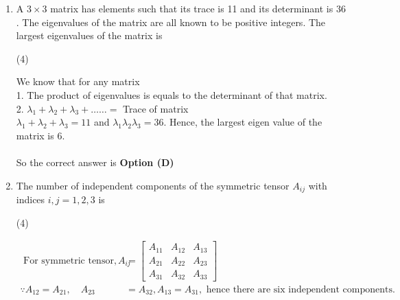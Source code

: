 \begin{enumerate}[label=\color{ocre}\textbf{\arabic*.}]
\begin{answer}
\begin{align*}
		\intertext{Thus, the matrices $A$ and $B\left(=P^{-1} A P\right)$ have the same characteristic equation and hence
			same characteristic roots or eigen values. Since, the sum of the eigen values of a matrix and product of eigen values of a matrix is equal to the determinant of matrix, hence third alternative is incorrect.}
		\end{align*}
		So the correct answer is \textbf{Option (C)}
	\end{answer}
	\item A $3 \times 3$ matrix has elements such that its trace is 11 and its determinant is 36 . The eigenvalues of the matrix are all known to be positive integers. The largest eigenvalues of the matrix is
	{}
	\begin{tasks}(4)
	\end{tasks}
	\begin{answer}
		We know that for any matrix\\
		1. The product of eigenvalues is equals to the determinant of that matrix.\\
		2. $\lambda_{1}+\lambda_{2}+\lambda_{3}+\ldots \ldots=$ Trace of matrix\\
		$\lambda_{1}+\lambda_{2}+\lambda_{3}=11$ and $\lambda_{1} \lambda_{2} \lambda_{3}=36$. Hence, the largest eigen value of the matrix is $6 .$\\\\
		So the correct answer is \textbf{Option (D)}
	\end{answer}
	\item  The number of independent components of the symmetric tensor $A_{i j}$ with indices $i, j=1,2,3$ is
	{}
	\begin{tasks}(4)
	\end{tasks}
	\begin{answer}
		\begin{align*}
		\text{	For symmetric tensor, }A_{i j}&=\left[\begin{array}{ccc}A_{11} & A_{12} & A_{13} \\ A_{21} & A_{22} & A_{23} \\ A_{31} & A_{32} & A_{33}\end{array}\right]\\
		\because A_{12}=A_{21}, \quad A_{23}&=A_{32}, A_{13}=A_{31},\text{ hence there are six independent components.}

\end{align*}
\end{answer}
\end{enumerate}

